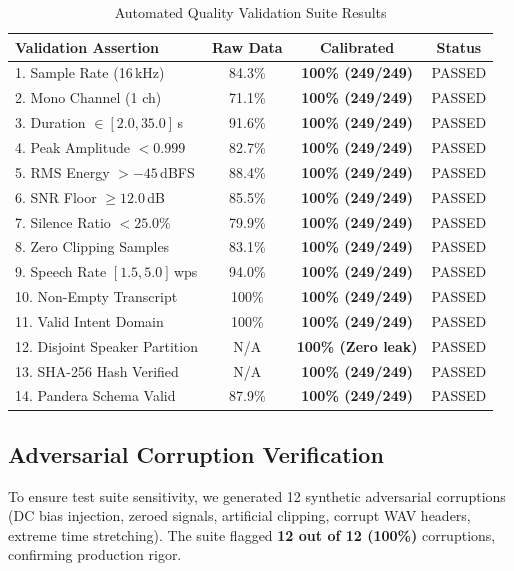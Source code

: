 \documentclass[sigconf,authordraft]{acmart}
\begin{document}
\begin{table}[h]
  \caption{Automated Quality Validation Suite Results}
  \label{tab:validation}
  \centering
  \small
  \begin{tabular}{lccc}
    \toprule
    \textbf{Validation Assertion} & \textbf{Raw Data} & \textbf{Calibrated} & \textbf{Status} \\
    \midrule
    1. Sample Rate (16\,kHz) & 84.3\% & \textbf{100\% (249/249)} & PASSED \\
    2. Mono Channel (1 ch) & 71.1\% & \textbf{100\% (249/249)} & PASSED \\
    3. Duration $\in [2.0, 35.0]$\,s & 91.6\% & \textbf{100\% (249/249)} & PASSED \\
    4. Peak Amplitude $< 0.999$ & 82.7\% & \textbf{100\% (249/249)} & PASSED \\
    5. RMS Energy $> -45$\,dBFS & 88.4\% & \textbf{100\% (249/249)} & PASSED \\
    6. SNR Floor $\ge 12.0$\,dB & 85.5\% & \textbf{100\% (249/249)} & PASSED \\
    7. Silence Ratio $< 25.0\%$ & 79.9\% & \textbf{100\% (249/249)} & PASSED \\
    8. Zero Clipping Samples & 83.1\% & \textbf{100\% (249/249)} & PASSED \\
    9. Speech Rate $[1.5, 5.0]$\,wps & 94.0\% & \textbf{100\% (249/249)} & PASSED \\
    10. Non-Empty Transcript & 100\% & \textbf{100\% (249/249)} & PASSED \\
    11. Valid Intent Domain & 100\% & \textbf{100\% (249/249)} & PASSED \\
    12. Disjoint Speaker Partition & N/A & \textbf{100\% (Zero leak)} & PASSED \\
    13. SHA-256 Hash Verified & N/A & \textbf{100\% (249/249)} & PASSED \\
    14. Pandera Schema Valid & 87.9\% & \textbf{100\% (249/249)} & PASSED \\
    \bottomrule
  \end{tabular}
\end{table}

\subsection{Adversarial Corruption Verification}

To ensure test suite sensitivity, we generated 12 synthetic adversarial corruptions
(DC bias injection, zeroed signals, artificial clipping, corrupt WAV headers, extreme time stretching).
The suite flagged \textbf{12 out of 12 (100\%)} corruptions, confirming production rigor.
\end{document}
